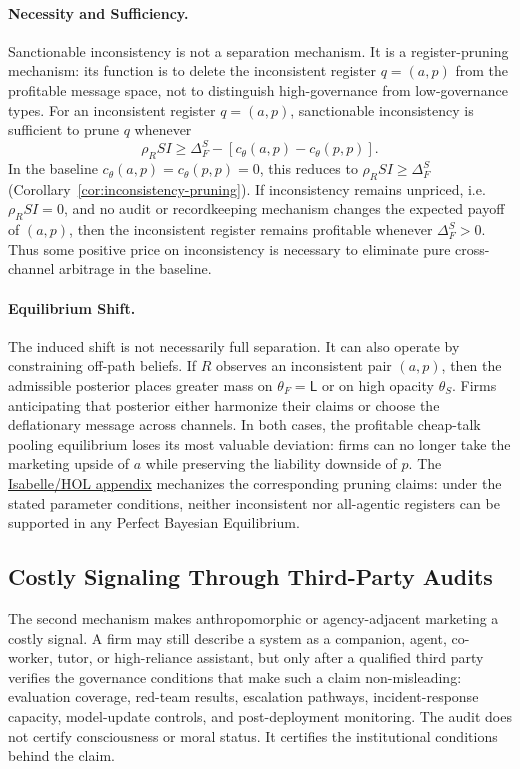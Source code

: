 \documentclass[review,authoryear]{elsarticle}
\theoremstyle{definition}
\theoremstyle{plain}
\begin{document}
\paragraph{Necessity and Sufficiency.}
Sanctionable inconsistency is not a separation mechanism.  It is a
register-pruning mechanism: its function is to delete the inconsistent
register $q=(a,p)$ from the profitable message space, not to distinguish
high-governance from low-governance types.
For an inconsistent register $q=(a,p)$, sanctionable inconsistency is
sufficient to prune $q$ whenever
\[
\rho_R SI \ge \Delta_F^S - [c_\theta(a,p)-c_\theta(p,p)].
\]
In the baseline $c_\theta(a,p)=c_\theta(p,p)=0$, this reduces to
$\rho_R SI \ge \Delta_F^S$
(Corollary~\ref{cor:inconsistency-pruning}).
If inconsistency remains unpriced, i.e.\ $\rho_R SI=0$, and no audit or
recordkeeping mechanism changes the expected payoff of $(a,p)$, then the
inconsistent register remains profitable whenever $\Delta_F^S>0$.
Thus some positive price on inconsistency is necessary to eliminate pure
cross-channel arbitrage in the baseline.

\paragraph{Equilibrium Shift.}
The induced shift is not necessarily full separation. It can also operate by
constraining off-path beliefs. If $R$ observes an inconsistent pair $(a,p)$,
then the admissible posterior places greater mass on $\theta_F=\mathsf{L}$ or
on high opacity $\theta_S$. Firms anticipating that posterior either harmonize
their claims or choose the deflationary message across channels. In both cases,
the profitable cheap-talk pooling equilibrium loses its most valuable deviation: firms can
no longer take the marketing upside of $a$ while preserving the liability
downside of $p$. The \hyperref[app:isabelle]{Isabelle/HOL appendix} mechanizes the corresponding pruning claims: under the stated parameter conditions, neither inconsistent nor all-agentic registers can be supported in any Perfect Bayesian Equilibrium.

\subsection{Costly Signaling Through Third-Party Audits}
\label{subsec:costly-signaling-audits}

The second mechanism makes anthropomorphic or agency-adjacent marketing a
costly signal. A firm may still describe a system as a companion, agent,
co-worker, tutor, or high-reliance assistant, but only after a qualified third
party verifies the governance conditions that make such a claim non-misleading:
evaluation coverage, red-team results, escalation pathways, incident-response
capacity, model-update controls, and post-deployment monitoring. The audit does
not certify consciousness or moral status. It certifies the institutional
conditions behind the claim.
\end{document}

